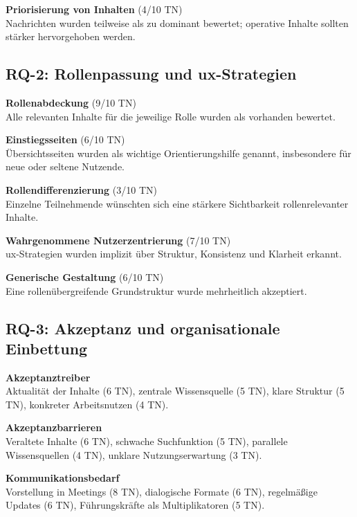 \textbf{Priorisierung von Inhalten} (4/10 TN) \\
Nachrichten wurden teilweise als zu dominant bewertet; operative Inhalte sollten stärker hervorgehoben werden.


\subsection{RQ-2: Rollenpassung und \Gls{ux}-Strategien}

\textbf{Rollenabdeckung} (9/10 TN) \\
Alle relevanten Inhalte für die jeweilige Rolle wurden als vorhanden bewertet.

\textbf{Einstiegsseiten} (6/10 TN) \\
Übersichtsseiten wurden als wichtige Orientierungshilfe genannt, insbesondere für neue oder seltene Nutzende.

\textbf{Rollendifferenzierung} (3/10 TN) \\
Einzelne Teilnehmende wünschten sich eine stärkere Sichtbarkeit rollenrelevanter Inhalte.

\textbf{Wahrgenommene Nutzerzentrierung} (7/10 TN) \\
\Gls{ux}-Strategien wurden implizit über Struktur, Konsistenz und Klarheit erkannt.

\textbf{Generische Gestaltung} (6/10 TN) \\
Eine rollenübergreifende Grundstruktur wurde mehrheitlich akzeptiert.

\newpage
\subsection{RQ-3: Akzeptanz und organisationale Einbettung}

\textbf{Akzeptanztreiber} \\
Aktualität der Inhalte (6 TN), zentrale Wissensquelle (5 TN), klare Struktur (5 TN), konkreter Arbeitsnutzen (4 TN).

\textbf{Akzeptanzbarrieren} \\
Veraltete Inhalte (6 TN), schwache Suchfunktion (5 TN), parallele Wissensquellen (4 TN), unklare Nutzungserwartung (3 TN).

\textbf{Kommunikationsbedarf} \\
Vorstellung in Meetings (8 TN), dialogische Formate (6 TN), regelmäßige Updates (6 TN), Führungskräfte als Multiplikatoren (5 TN).

